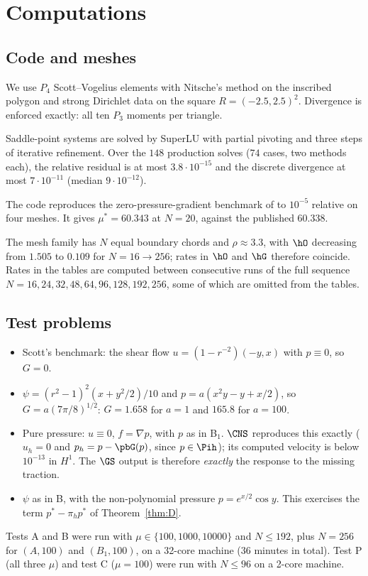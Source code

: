 \section{Computations}\label{sec:numerics}

\subsection*{Code and meshes}
We use $P_4$ Scott--Vogelius elements with Nitsche's method on the inscribed polygon and strong Dirichlet data on the square $R=(-2.5,2.5)^2$. Divergence is enforced exactly: all ten $P_3$ moments per triangle.

Saddle-point systems are solved by SuperLU \cite{SuperLU} with partial pivoting and three steps of iterative refinement. Over the $148$ production solves ($74$ cases, two methods each), the relative residual is at most $3.8\cdot10^{-15}$ and the discrete divergence at most $7\cdot10^{-11}$ (median $9\cdot10^{-12}$).

The code reproduces the zero-pressure-gradient benchmark of \cite{Cavalcante} to $10^{-5}$ relative on four meshes. It gives $\mu^\ast=60.343$ at $N=20$, against the published $60.338$.

The mesh family has $N$ equal boundary chords and $\rho\approx3.3$, with $\hO$ decreasing from $1.505$ to $0.109$ for $N=16\to256$; rates in $\hO$ and $\hG$ therefore coincide. Rates in the tables are computed between consecutive runs of the full sequence $N=16,24,32,48,64,96,128,192,256$, some of which are omitted from the tables.

\subsection*{Test problems}
\begin{itemize}
\item[\textbf{A}] Scott's benchmark: the shear flow $u=(1-r^{-2})(-y,x)$ with $p\equiv0$, so $G=0$.
\item[\textbf{B$_a$}] $\psi=(r^2-1)^2(x+y^2/2)/10$ and $p=a(x^2y-y+x/2)$, so $G=a(7\pi/8)^{1/2}$: $G=1.658$ for $a=1$ and $165.8$ for $a=100$.
\item[\textbf{P}] Pure pressure: $u\equiv0$, $f=\nabla p$, with $p$ as in B$_1$. $\CNS$ reproduces this exactly ($u_h=0$ and $p_h=p-\pbG(p)$, since $p\in\Pih$); its computed velocity is below $10^{-13}$ in $H^1$. The $\GS$ output is therefore \emph{exactly} the response to the missing traction.
\item[\textbf{C}] $\psi$ as in B, with the non-polynomial pressure $p=e^{x/2}\cos y$. This exercises the term $p^\ast-\pi_hp^\ast$ of Theorem~\ref{thm:D}.
\end{itemize}
Tests A and B were run with $\mu\in\{100,1000,10000\}$ and $N\le192$, plus $N=256$ for $(A,100)$ and $(B_1,100)$, on a 32-core machine (36 minutes in total). Test P (all three $\mu$) and test C ($\mu=100$) were run with $N\le96$ on a 2-core machine.

